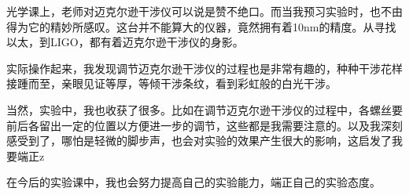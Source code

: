 \documentclass{ctexart}
\begin{document}
      光学课上，老师对迈克尔逊干涉仪可以说是赞不绝口。而当我预习实验时，也不由得为它的精妙所感叹。这台并不能算大的仪器，竟然拥有着10nm的精度。从寻找以太，到LIGO，都有着迈克尔逊干涉仪的身影。

      实际操作起来，我发现调节迈克尔逊干涉仪的过程也是非常有趣的，种种干涉花样接踵而至，亲眼见证等厚，等倾干涉条纹，看到彩虹般的白光干涉。

      当然，实验中，我也收获了很多。比如在调节迈克尔逊干涉仪的过程中，各螺丝要前后各留出一定的位置以方便进一步的调节，这些都是我需要注意的。以及我深刻感受到了，哪怕是轻微的脚步声，也会对实验的效果产生很大的影响，这启发了我要端正z

      在今后的实验课中，我也会努力提高自己的实验能力，端正自己的实验态度。
    
\end{document}
